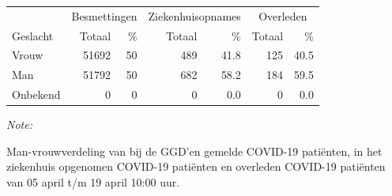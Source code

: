 \documentclass[
  english,
  man,floatsintext]{apa6}
\begin{document}
\begin{table}
\centering\begingroup\fontsize{11}{13}\selectfont

\begin{threeparttable}
\begin{tabular}{lrrrrrr}
\toprule
\multicolumn{1}{c}{ } & \multicolumn{2}{c}{Besmettingen} & \multicolumn{2}{c}{Ziekenhuisopnames} & \multicolumn{2}{c}{Overleden} \\
\cmidrule(l{3pt}r{3pt}){2-3} \cmidrule(l{3pt}r{3pt}){4-5} \cmidrule(l{3pt}r{3pt}){6-7}
Geslacht & Totaal & \% & Totaal & \% & Totaal & \%\\
\midrule
Vrouw & 51692 & 50 & 489 & 41.8 & 125 & 40.5\\
Man & 51792 & 50 & 682 & 58.2 & 184 & 59.5\\
Onbekend & 0 & 0 & 0 & 0.0 & 0 & 0.0\\
\bottomrule
\end{tabular}
\begin{tablenotes}
\item \textit{Note: } 
\item Man-vrouwverdeling van bij de GGD’en gemelde COVID-19 patiënten, in het ziekenhuis opgenomen COVID-19 patiënten en overleden COVID-19 patiënten van 05 april t/m 19 april 10:00 uur.
\end{tablenotes}
\end{threeparttable}
\endgroup{}
\end{table}
\newpage
\end{document}
